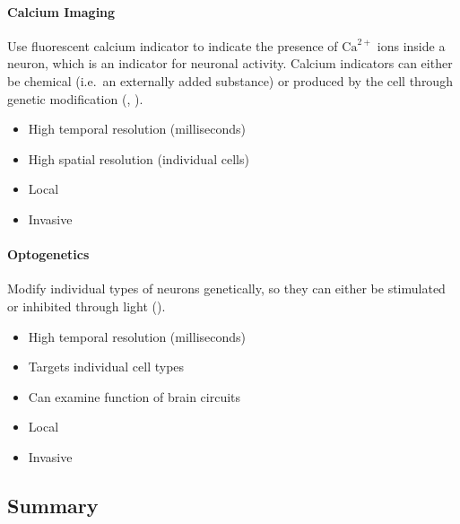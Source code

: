 \documentclass[10pt,letterpaper,oneside]{article}
\begin{document}
\paragraph{Calcium Imaging}
Use fluorescent calcium indicator to indicate the presence of $\mathrm{Ca}^{2+}$ ions inside a neuron, which is an indicator for neuronal activity. Calcium indicators can either be chemical (i.e.~an externally added substance) or produced by the cell through genetic modification (, ).
\begin{multicols}{2}
	\begin{itemize}
		\item[\OPlus] High temporal resolution (milliseconds)
		\item[\OPlus] High spatial resolution (individual cells)
	\end{itemize}
	\columnbreak
	\begin{itemize}
		\item[\OMinus] Local
		\item[\OMinus] Invasive
	\end{itemize}
\end{multicols}

\paragraph{Optogenetics}
Modify individual types of neurons genetically, so they can either be stimulated or inhibited through light ().
\begin{multicols}{2}
	\begin{itemize}
		\item[\OPlus] High temporal resolution (milliseconds)
		\item[\OPlus] Targets individual cell types
		\item[\OPlus] Can examine function of brain circuits
	\end{itemize}
	\columnbreak
	\begin{itemize}
		\item[\OMinus] Local
		\item[\OMinus] Invasive
	\end{itemize}
\end{multicols}

\subsection{Summary}
\end{document}
